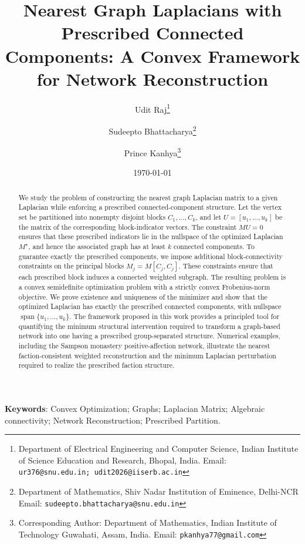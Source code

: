 \documentclass[11pt]{article}
\date{}
\title{\bf Nearest Graph Laplacians with Prescribed Connected Components: A Convex Framework for Network Reconstruction}
\begin{document}
	
	
	\author{  
		Udit Raj\thanks{Department of Electrical Engineering and Computer Science, Indian Institute of Science Education and Research, Bhopal, India. Email: \texttt{ur376@snu.edu.in; udit2026@iiserb.ac.in}} 
		\and
		Sudeepto Bhattacharya\thanks{Department of Mathematics, Shiv Nadar Institution of Eminence, Delhi-NCR Email: \texttt{sudeepto.bhattacharya@snu.edu.in}}
        \and
        Prince Kanhya\thanks{Corresponding Author: Department of Mathematics, Indian Institute of Technology Guwahati, Assam, India. Email: \texttt{pkanhya77@gmail.com}}
        }
	\date{\today}
	\maketitle
\begin{abstract}
	We study the problem of constructing the nearest graph Laplacian matrix to a given Laplacian while enforcing a prescribed connected-component structure. Let the vertex set be partitioned into nonempty disjoint blocks $C_1,\ldots,C_k$, and let $U=[u_1,\ldots,u_k]$ be the matrix of the corresponding block-indicator vectors. The constraint $MU=0$ ensures that these prescribed indicators lie in the nullspace of the optimized Laplacian $M^\star$, and hence the associated graph has at least $k$ connected components. To guarantee exactly the prescribed components, we impose additional block-connectivity constraints on the principal blocks $M_j=M[C_j,C_j]$. These constraints ensure that each prescribed block induces a connected weighted subgraph. The resulting problem is a convex semidefinite optimization problem with a strictly convex Frobenius-norm objective. We prove existence and uniqueness of the minimizer and show that the optimized Laplacian has exactly the prescribed connected components, with nullspace $\operatorname{span}\{u_1,\ldots,u_k\}$. The framework proposed in this work provides a principled tool for quantifying the minimum structural intervention required to transform a graph-based network into one having a prescribed group-separated structure. Numerical examples, including the Sampson monastery positive-affection network, illustrate the nearest faction-consistent weighted reconstruction and the minimum Laplacian perturbation required to realize the prescribed faction structure.
\end{abstract}

\vspace{0.5cm}

\textbf{Keywords}: Convex Optimization; Graphs; Laplacian Matrix; Algebraic connectivity; Network Reconstruction; Prescribed Partition.
\end{document}
